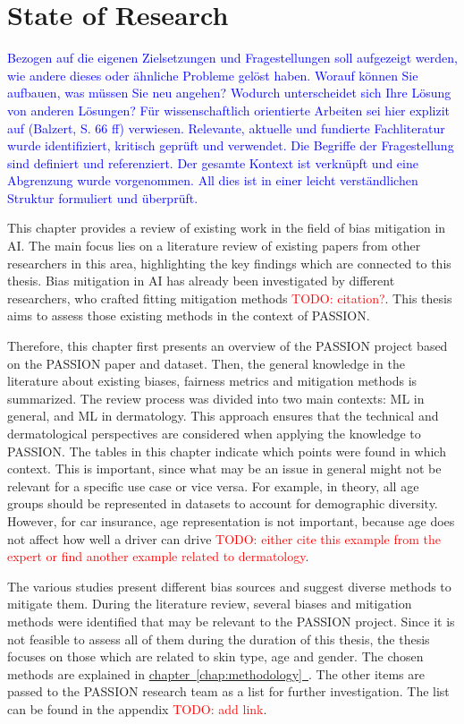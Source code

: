 \documentclass[12pt, a4paper, oneside]{book}   	%
\renewcommand{\todo}[1]{\textcolor{red}{TODO: #1}}
\newcommand{\linkchap}[1]{\hyperref[#1]{chapter~\ref{#1}~\nameref{#1}}}
\newcommand{\baaCriteria}[1]{\textcolor{blue}{#1}}
\begin{document}
	\chapter{State of Research}
		\baaCriteria{Bezogen auf die eigenen Zielsetzungen und Fragestellungen soll aufgezeigt werden, wie andere dieses oder ähnliche Probleme gelöst haben. Worauf können Sie aufbauen, was müssen Sie neu angehen?	Wodurch unterscheidet sich Ihre Lösung von anderen Lösungen? Für wissenschaftlich orientierte Arbeiten sei hier explizit auf (Balzert, S. 66 ff) verwiesen.}
		\baaCriteria{Relevante, aktuelle und fundierte Fachliteratur wurde identifiziert, kritisch geprüft und verwendet. Die Begriffe der Fragestellung sind definiert und referenziert. Der gesamte Kontext ist verknüpft und eine Abgrenzung wurde vorgenommen. All dies ist in einer leicht verständlichen Struktur formuliert und überprüft.}
		
		This chapter provides a review of existing work in the field of bias mitigation in \gls{AI}. The main focus lies on a literature review of existing papers from other researchers in this area, highlighting the key findings which are connected to this thesis. Bias mitigation in \gls{AI} has already been investigated by different researchers, who crafted fitting mitigation methods \todo{citation?}. This thesis aims to assess those existing methods in the context of PASSION.
		
		Therefore, this chapter first presents an overview of the PASSION project based on the PASSION paper and dataset. Then, the general knowledge in the literature about existing biases, fairness metrics and mitigation methods is summarized. The review process was divided into two main contexts: \gls{ML} in general, and \gls{ML} in dermatology. This approach ensures that the technical and dermatological perspectives are considered when applying the knowledge to PASSION. The tables in this chapter indicate which points were found in which context. This is important, since what may be an issue in general might not be relevant for a specific use case or vice versa. For example, in theory, all age groups should be represented in datasets to account for demographic diversity. However, for car insurance, age representation is not important, because age does not affect how well a driver can drive \todo{either cite this example from the expert or find another example related to dermatology}.
		
		The various studies present different bias sources and suggest diverse methods to mitigate them. During the literature review, several biases and mitigation methods were identified that may be relevant to the PASSION project. Since it is not feasible to assess all of them during the duration of this thesis, the thesis focuses on those which are related to skin type, age and gender. The chosen methods are explained in \linkchap{chap:methodology}. The other items are passed to the PASSION research team as a list for further investigation. The list can be found in the appendix \todo{add link}.
		
\end{document}
